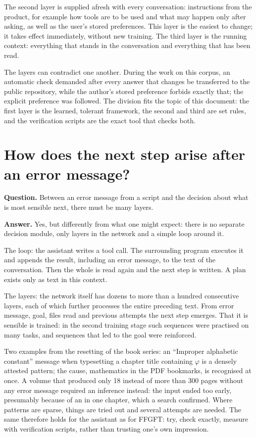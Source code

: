 The second layer is supplied afresh with every conversation: instructions from the product, for
example how tools are to be used and what may happen only after asking, as well as the user's stored
preferences. This layer is the easiest to change; it takes effect immediately, without new training.
The third layer is the running context: everything that stands in the conversation and everything
that has been read.

The layers can contradict one another. During the work on this corpus, an automatic check demanded
after every answer that changes be transferred to the public repository, while the author's stored
preference forbids exactly that; the explicit preference was followed. The division fits the topic
of this document: the first layer is the learned, tolerant framework, the second and third are set
rules, and the verification scripts are the exact tool that checks both.

\section{How does the next step arise after an error message?}

\textbf{Question.} Between an error message from a script and the decision about what is most sensible
next, there must be many layers.

\textbf{Answer.} Yes, but differently from what one might expect: there is no separate decision
module, only layers in the network and a simple loop around it.

The loop: the assistant writes a tool call. The surrounding program executes it and appends the
result, including an error message, to the text of the conversation. Then the whole is read again and
the next step is written. A plan exists only as text in this context.

The layers: the network itself has dozens to more than a hundred consecutive layers, each of which
further processes the entire preceding text. From error message, goal, files read and previous
attempts the next step emerges. That it is sensible is trained: in the second training stage such
sequences were practised on many tasks, and sequences that led to the goal were reinforced.

Two examples from the resetting of the book series: an \enquote{Improper alphabetic constant} message
when typesetting a chapter title containing $\varphi$ is a densely attested pattern; the cause,
mathematics in the PDF bookmarks, is recognised at once. A volume that produced only 18 instead of
more than 300 pages without any error message required an inference instead: the input ended too
early, presumably because of an \verb|| in one chapter, which a search confirmed. Where
patterns are sparse, things are tried out and several attempts are needed. The same therefore holds
for the assistant as for FFGFT: try, check exactly, measure with verification scripts, rather than
trusting one's own impression.

